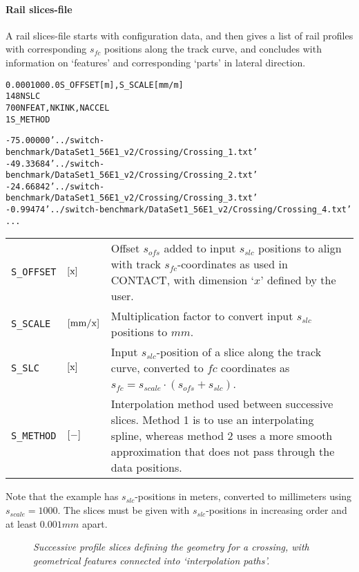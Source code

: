 \documentclass[12pt]{report}
\newenvironment{inputvars}{\vspace{0.4\baselineskip}%

\begin{tabular}{>{\raggedright}p{22mm}p{19mm}p{113mm}}}{
\end{tabular}

}
\newcommand{\inpvar}[3]{{\small\tt #1} & $#2$ & #3 \\[1ex]}
\newcommand{\inpbreak}{\end{inputvars}\begin{inputvars}}
\begin{document}
\paragraph{Rail slices-file}

A rail slices-file starts with configuration data, and then gives a list of
rail profiles with corresponding $s_{fc}$ positions along the track curve,
and concludes with information on `features' and corresponding `parts'
in lateral direction.
\begin{alltt}\small
% data for S+C benchmark, UK crossing '56E1-R245-1:9.25'

   0.000    1000.0   S_OFFSET [m], S_SCALE [mm/m]
     148             NSLC
       7    0    0   NFEAT, NKINK, NACCEL
       1             S_METHOD

%  - slice positions S_SLC [m] and filenames RFNAME per slice

 -75.00000   '../switch-benchmark/DataSet1_56E1_v2/Crossing/Crossing_1.txt'
 -49.33684   '../switch-benchmark/DataSet1_56E1_v2/Crossing/Crossing_2.txt'
 -24.66842   '../switch-benchmark/DataSet1_56E1_v2/Crossing/Crossing_3.txt'
  -0.99474   '../switch-benchmark/DataSet1_56E1_v2/Crossing/Crossing_4.txt'
          ...
\end{alltt}
\begin{inputvars}
\inpvar{S\_OFFSET}{\bunit{x}}{Offset $s_{ofs}$ added to input $s_{slc}$
        positions to align with track $s_{fc}$-coordinates as used in
        CONTACT, with dimension `$\unit{x}$' defined by the user.}
\inpvar{S\_SCALE}{\bunit{mm/x}}{Multiplication factor to convert input
        $s_{slc}$ positions to $\unit{mm}$.}
\inpvar{S\_SLC}{\bunit{x}}{Input $s_{slc}$-position of a slice along the
        track curve, converted to $fc$ coordinates as $s_{fc} = s_{scale}
        \cdot (s_{ofs} + s_{slc})$.}
\inpvar{S\_METHOD}{\bunit{-}}{Interpolation method used between successive
        slices. Method 1 is to use an interpolating spline, whereas method
        2 uses a more smooth approximation that does not pass through the
        data positions.}
\end{inputvars}
Note that the example has $s_{slc}$-positions in meters, converted to
millimeters using $s_{scale}=1000$. The slices must be given with
$s_{slc}$-positions in increasing order and at least $0.001\unit{mm}$ apart.

\begin{figure}[bt]
\centering
{}
\caption{\em Successive profile slices defining the geometry for a crossing,
        with geometrical features connected into `interpolation paths'.}
\label{fig:slcs_features}
\end{figure}
\end{document}
